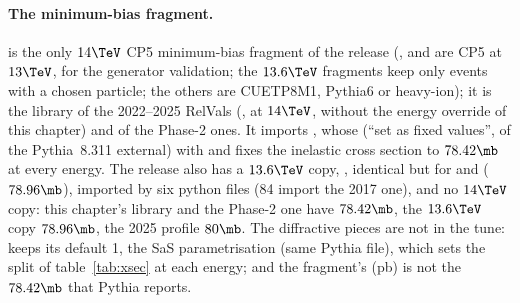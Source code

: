 \paragraph{The minimum-bias fragment.} 
is the only $14\TeV$ CP5 minimum-bias fragment of the release (,
 and  are CP5 at $13\TeV$,
for the generator validation; the $13.6\TeV$  fragments keep only events with a chosen particle; the
others are CUETP8M1, Pythia6 or heavy-ion); it is the library of the 2022--2025 RelVals (,
at $14\TeV$, without the energy override of this chapter) and of the Phase-2 ones. It imports
, whose  (``set as fixed values'',
 of the Pythia~8.311 external) with  and  fixes the inelastic cross section to $78.42\mb$ at every energy. The release also has a $13.6\TeV$ copy,
, identical but for  and
 ($78.96\mb$), imported by six python files (84 import the 2017 one), and no $14\TeV$ copy:
this chapter's library and the Phase-2 one have $78.42\mb$, the $13.6\TeV$ copy $78.96\mb$, the 2025 profile
$80\mb$. The diffractive pieces are not in the tune:  keeps its default 1, the SaS
parametrisation (same Pythia file), which sets the split of table~\ref{tab:xsec} at each energy; and the
fragment's  (pb) is not the $78.42\mb$ that Pythia reports.

\begingroup\sloppy
